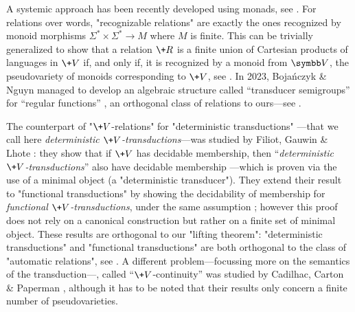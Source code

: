A systemic approach has been recently developed using monads, see .
For relations over words, "recognizable 
relations" are exactly the ones recognized by monoid morphisms $\Sigma^* \times \Sigma^* \to M$ 
where $M$ is finite. This can be trivially generalized to show 
that a relation $\+R$ is a finite union of Cartesian products of languages in $\+V$ if, and only 
if, it is recognized by a monoid from $\B{V}$, the pseudovariety of monoids corresponding to
$\+V$, see .
In 2023, Bojańczyk \& Nguyn 
managed to develop an algebraic structure called ``transducer semigroups'' for ``regular functions'' \cite[Theorem 3.2, p.~6]{Bojanczyk2023Algebraic}, an 
orthogonal class of relations to ours---see .

The counterpart of "$\+V$-relations" for "deterministic transductions"
---that we call here \emph{deterministic $\+V$-transductions}---was studied by Filiot, Gauwin \& Lhote \cite{Filiot2019Logical}: they show that if
$\+V$ has decidable membership, then ``\emph{deterministic $\+V$-transductions}''
also have decidable membership \cite[Theorem 2.1]{Filiot2019Logical}---which is
proven via the use of a minimal object (a "deterministic transducer").
They extend their result to "functional transductions"
by showing the decidability of membership for \emph{functional $\+V$-transductions},
under the same assumption \cite[Theorem 4.10, p.~26]{Filiot2019Logical};
however this proof does not rely on a canonical construction but rather
on a finite set of minimal object.
These results are orthogonal to our "lifting theorem": 
"deterministic transductions" and "functional transductions"
are both orthogonal to the class of "automatic relations", see
.
A different problem---focussing more on the semantics of the transduction---, called ``$\+V$-continuity'' was studied by Cadilhac, Carton \& Paperman \cite[Theorem 1.3, p.~3]{Cadilhac2020Continuity}, although it has to be noted that their results only concern
a finite number of pseudovarieties.